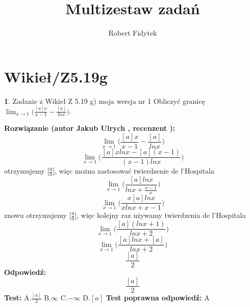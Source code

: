 \documentclass[12pt, a4paper]{article}
\title{Multizestaw zadań}
\author{Robert Fidytek}
\date{}
\theoremstyle{definition} %
\newtheorem{zad}{}
\newcommand{\kategoria}[1]{\section{#1}} %
\newcommand{\zadStart}[1]{\begin{zad}#1\newline} %
\newcommand{\zadStop}{\end{zad}}   %
\newcommand{\rozwStart}[2]{\noindent \textbf{Rozwiązanie (autor #1 , recenzent #2): }\newline} %
\newcommand{\rozwStop}{\newline}                                            %
\newcommand{\odpStart}{\noindent \textbf{Odpowiedź:}\newline}    %
\newcommand{\odpStop}{\newline}                                             %
\newcommand{\testStart}{\noindent \textbf{Test:}\newline} %
\newcommand{\testStop}{\newline} %
\newcommand{\kluczStart}{\noindent \textbf{Test poprawna odpowiedź:}\newline} %
\newcommand{\kluczStop}{\newline} %
\begin{document}
\maketitle


\kategoria{Wikieł/Z5.19g}
\zadStart{Zadanie z Wikieł Z 5.19 g) moja wersja nr 1}
Obliczyć granicę $\lim_{x \to 1}\big(\frac{[a]x}{x-1}-\frac{[a]}{lnx}\big)$.
\zadStop
\rozwStart{Jakub Ulrych}{}
$$\lim_{x \to 1}\big(\frac{[a]x}{x-1}-\frac{[a]}{lnx}\big)$$
$$\lim_{x \to 1}\big(\frac{[a]xlnx-[a](x-1)}{(x-1)lnx}\big)$$
otrzymujemy $\big[\frac{0}{0}\big]$, więc można zastosować twierdzenie de l'Hospitala
$$\lim_{x \to 1}\big(\frac{[a]lnx}{lnx+\frac{x-1}{x}}\big)$$
$$\lim_{x \to 1}\big(\frac{x[a]lnx}{xlnx+x-1}\big)$$
znowu otrzymujemy $\big[\frac{0}{0}\big]$, więc kolejny raz używamy twierdzenia de l'Hospitala
$$\lim_{x \to 1}\big(\frac{[a](lnx+1)}{lnx+2}\big)$$
$$\lim_{x \to 1}\big(\frac{[a]lnx+[a]}{lnx+2}\big)$$
$$\frac{[a]}{2}$$
\rozwStop
\odpStart
$$\frac{[a]}{2}$$
\odpStop
\testStart
A.$\frac{[a]}{2}$
B.$\infty$
C.$-\infty$
D.$[a]$
\testStop
\kluczStart
A
\kluczStop
\end{document}
